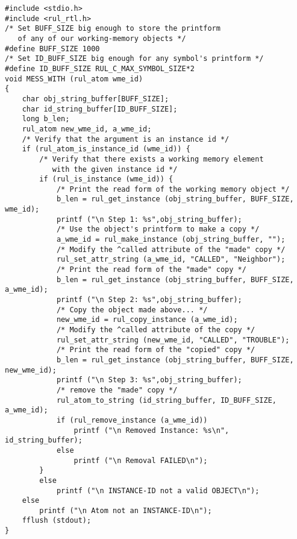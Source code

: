 \begin{exampl}
\begin{verbatim}
#include <stdio.h>
#include <rul_rtl.h>
/* Set BUFF_SIZE big enough to store the printform
   of any of our working-memory objects */
#define BUFF_SIZE 1000
/* Set ID_BUFF_SIZE big enough for any symbol's printform */
#define ID_BUFF_SIZE RUL_C_MAX_SYMBOL_SIZE*2
void MESS_WITH (rul_atom wme_id)
{
    char obj_string_buffer[BUFF_SIZE];
    char id_string_buffer[ID_BUFF_SIZE];
    long b_len;
    rul_atom new_wme_id, a_wme_id;
    /* Verify that the argument is an instance id */
    if (rul_atom_is_instance_id (wme_id)) {
        /* Verify that there exists a working memory element
           with the given instance id */
        if (rul_is_instance (wme_id)) {
            /* Print the read form of the working memory object */
            b_len = rul_get_instance (obj_string_buffer, BUFF_SIZE, wme_id);
            printf ("\n Step 1: %s",obj_string_buffer);
            /* Use the object's printform to make a copy */
            a_wme_id = rul_make_instance (obj_string_buffer, "");
            /* Modify the ^called attribute of the "made" copy */
            rul_set_attr_string (a_wme_id, "CALLED", "Neighbor");
            /* Print the read form of the "made" copy */
            b_len = rul_get_instance (obj_string_buffer, BUFF_SIZE, a_wme_id);
            printf ("\n Step 2: %s",obj_string_buffer);
            /* Copy the object made above... */
            new_wme_id = rul_copy_instance (a_wme_id);
            /* Modify the ^called attribute of the copy */
            rul_set_attr_string (new_wme_id, "CALLED", "TROUBLE");
            /* Print the read form of the "copied" copy */
            b_len = rul_get_instance (obj_string_buffer, BUFF_SIZE, new_wme_id);
            printf ("\n Step 3: %s",obj_string_buffer);
            /* remove the "made" copy */
            rul_atom_to_string (id_string_buffer, ID_BUFF_SIZE, a_wme_id);
            if (rul_remove_instance (a_wme_id))
                printf ("\n Removed Instance: %s\n", id_string_buffer);
            else
                printf ("\n Removal FAILED\n");
        }
        else
            printf ("\n INSTANCE-ID not a valid OBJECT\n");
    else
        printf ("\n Atom not an INSTANCE-ID\n");
    fflush (stdout);
}
\end{verbatim}
\label{e:6-9}
\end{exampl}

